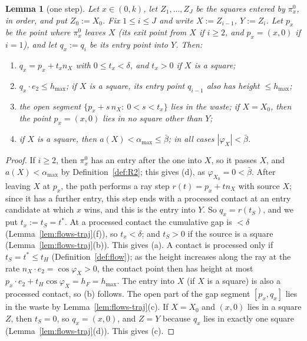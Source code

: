 \documentclass[11pt]{amsart}
\newcommand{\amax}{\alpha_{\max}}
\newcommand{\hmax}{h_{\max}}
\newcommand{\bbar}{\bar\beta}
\newtheorem{lemma}[theorem]{Lemma}
\theoremstyle{definition}
\theoremstyle{remark}
\numberwithin{equation}{section}
\begin{document}
\begin{lemma}[one step]\label{lem:P6-step}
Let $x\in(0,k)$, let $Z_1,\dots,Z_J$ be the squares entered by $\pi^0_x$, in order, and put $Z_0:=X_0$. Fix
$1\le i\le J$ and write $X:=Z_{i-1}$, $Y:=Z_i$. Let $p_x$ be the point where $\pi^0_x$ leaves $X$ \textup{(}its exit
point from $X$ if $i\ge2$, and $p_x=(x,0)$ if $i=1$\textup{)}, and let $q_x:=q_i$ be its entry point into $Y$. Then:
\begin{enumerate}[label=(\alph*)]
\item $q_x=p_x+t_xn_X$ with $0\le t_x<\delta$, and $t_x>0$ if $X$ is a square;
\item $q_x\cdot e_2\le\hmax$; if $X$ is a square, its entry point $q_{i-1}$ also has height $\le\hmax$;
\item the open segment $\{p_x+s\,n_X:\ 0<s<t_x\}$ lies in the waste; if $X=X_0$, then the point $p_x=(x,0)$ lies in
no square other than $Y$;
\item if $X$ is a square, then $a(X)<\amax\le\bbar$; in all cases $|\varphi_X|<\bbar$.
\end{enumerate}
\end{lemma}

\begin{proof}
If $i\ge2$, then $\pi^0_x$ has an entry after the one into $X$, so it passes $X$, and $a(X)<\amax$ by
Definition~\ref{def:R2}; this gives (d), as $\varphi_{X_0}=0<\bbar$. After leaving $X$ at $p_x$, the path performs
a ray step $r(t)=p_x+tn_X$ with source $X$; since it has a further entry, this step ends with a processed contact at
an entry candidate at which $x$ wins, and this is the entry into $Y$. So $q_x=r(t_S)$, and we put $t_x:=t_S=t^*$. At
a processed contact the cumulative gap is $<\delta$ (Lemma~\ref{lem:flows-traj}(f)), so $t_x<\delta$; and $t_S>0$
if the source is a square (Lemma~\ref{lem:flows-traj}(b)). This gives (a). A contact is processed only if
$t_S=t^*\le t_H$ (Definition~\ref{def:flow}); as the height increases along the ray at the rate
$n_X\cdot e_2=\cos\varphi_X>0$, the contact point then has height at most
$p_x\cdot e_2+t_H\cos\varphi_X=h_F=\hmax$. The entry into $X$ (if $X$ is a square) is also a processed contact, so (b)
follows. The open part of the gap segment
$[p_x,q_x]$ lies in the waste by Lemma~\ref{lem:flows-traj}(c). If $X=X_0$ and $(x,0)$ lies in a square $Z$, then
$t_S=0$, so $q_x=(x,0)$, and $Z=Y$ because $q_x$ lies in exactly one square (Lemma~\ref{lem:flows-traj}(d)). This
gives (c).
\end{proof}
\end{document}
